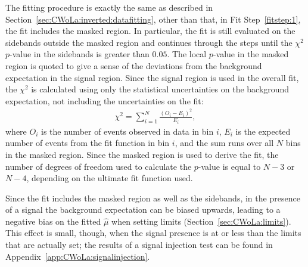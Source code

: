 The fitting procedure is exactly the same as described in Section~\ref{sec:CWoLa:inverted:datafitting}, other than that, in Fit Step~\ref{fitstep:1}, the fit includes the masked region.
In particular, the fit is still evaluated on the sidebands outside the masked region and continues through the steps until the $\chi^2$ $p$-value in the sidebands is greater than $0.05$.
The local $p$-value in the masked region is quoted to give a sense of the deviations from the background expectation in the signal region.
Since the signal region is used in the overall fit, the $\chi^2$ is calculated using only the statistical uncertainties on the background expectation, not including the uncertainties on the fit:
\begin{align}
  \label{eqn:CWoLa:signal_chi2}
  \chi^2=\sum_{i=1}^N \frac{(O_i-E_i)^2}{E_i},
\end{align}
\noindent where $O_i$ is the number of events observed in data in bin $i$, $E_i$ is the expected number of events from the fit function in bin $i$, and the sum runs over all $N$ bins in the masked region.
Since the masked region is used to derive the fit, the number of degrees of freedom used to calculate the $p$-value is equal to $N-3$ or $N-4$, depending on the ultimate fit function used.

Since the fit includes the masked region as well as the sidebands, in the presence of a signal the background expectation can be biased upwards, leading to a negative bias on the fitted $\hat{\mu}$ when setting limits (Section~\ref{sec:CWoLa:limits}).
This effect is small, though, when the signal presence is at or less than the limits that are actually set; the results of a signal injection test can be found in Appendix~\ref{app:CWoLa:signalinjection}.

